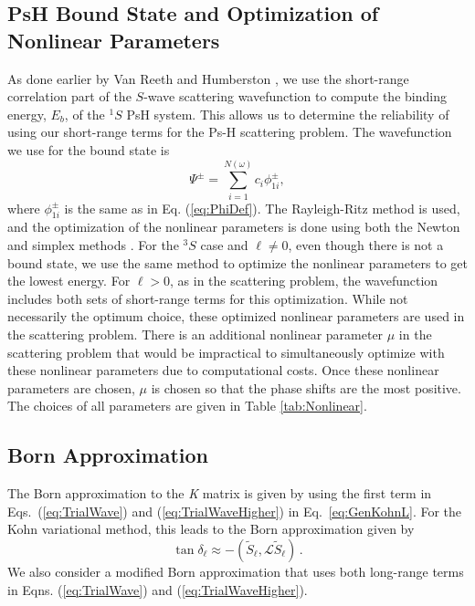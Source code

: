 \documentclass[preprint,showpacs,showkeys,preprintnumbers,amsmath,amssymb,longbibliography,pra,aps]{revtex4-1}
\begin{document}

\subsection{PsH Bound State and Optimization of Nonlinear Parameters}
As done earlier by Van Reeth and Humberston \cite{VanReeth2003,VanReeth2004},
we use the short-range correlation part of the $S$-wave scattering wavefunction
to compute the binding energy, $E_b$, of the $^1S$ PsH system. This allows us
to determine the reliability of using our short-range terms for the Ps-H 
scattering problem. The wavefunction we use for the bound state is
\begin{equation}
\label{eq:BoundWavefn}
\Psi^\pm = \sum_{i=1}^{N(\omega)} c_i \phi_{1i}^\pm,
\end{equation}
where $\phi_{1i}^\pm$ is the same as in Eq. (\ref{eq:PhiDef}). The
Rayleigh-Ritz method is used, and the optimization of the nonlinear parameters
is done using both the Newton \cite{Yan1999} and simplex methods \cite{GSL}.
For the $^3S$ case and $\ell \neq 0$, even though there is not a bound state,
we use 
the same method to optimize the nonlinear parameters to get the lowest 
energy. For $\ell > 0$, as in the scattering problem, the wavefunction 
includes both sets of short-range terms for this optimization. While not 
necessarily the optimum choice, these optimized nonlinear parameters are used 
in the scattering problem. There is an additional nonlinear parameter $\mu$ 
in the scattering problem that would be impractical to simultaneously 
optimize with these nonlinear parameters due to computational costs. Once 
these nonlinear parameters are chosen, $\mu$ is chosen so that the phase 
shifts are the most positive. The choices of all parameters are given in 
Table \ref{tab:Nonlinear}.

\subsection{Born Approximation}

The Born approximation to the \emph{K} matrix \cite{Bransden2003} is given by
using the first term in Eqs.~(\ref{eq:TrialWave}) and
(\ref{eq:TrialWaveHigher}) in Eq.~\ref{eq:GenKohnL}. For the Kohn variational
method, this leads to the Born approximation given by
\begin{equation}
\label{eq:Born}
\tan\delta_\ell \approx -(\widetilde{S}_\ell,\mathcal{L}\widetilde{S}_\ell )\,.
\end{equation}
We also consider a modified Born approximation that uses both long-range terms
in Eqns. (\ref{eq:TrialWave}) and (\ref{eq:TrialWaveHigher}).
\end{document}
